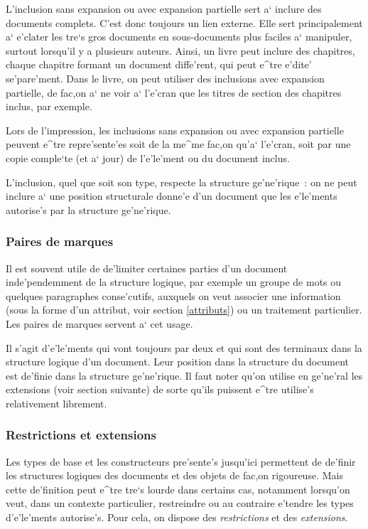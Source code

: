 L'inclusion sans expansion ou avec expansion partielle sert a` inclure
des documents complets. C'est donc toujours un lien externe. Elle sert
principalement a` e'clater les tre`s gros documents en sous-documents
plus faciles a` manipuler, surtout lorsqu'il y a plusieurs auteurs.
Ainsi, un livre peut inclure des chapitres, chaque chapitre formant
un document diffe'rent, qui peut e^tre e'dite' se'pare'ment. Dans le
livre, on peut utiliser des inclusions avec expansion partielle,
de fac,on a` ne voir a` l'e'cran que les titres de section des chapitres
inclus, par exemple.

Lors de l'impression, les inclusions sans expansion ou avec expansion
partielle peuvent e^tre repre'sente'es soit de la me^me fac,on qu'a`
l'e'cran, soit par une copie comple`te (et a` jour) de l'e'le'ment
ou du document inclus.

L'inclusion, quel que soit son type, respecte la structure ge'ne'rique~:
on ne peut inclure a` une
position structurale donne'e d'un document que les e'le'ments autorise's par
la structure ge'ne'rique.

\subsubsection{Paires de marques}

Il est souvent utile de de'limiter certaines parties d'un document
inde'pendemment de la structure logique, par exemple un groupe de mots
ou quelques paragraphes conse'cutifs, auxquels on veut associer une
information (sous la forme d'un attribut, voir section \ref{attributs})
ou un traitement particulier. Les paires de marques servent a` cet usage.

Il s'agit d'e'le'ments qui vont toujours par deux et qui sont des
terminaux dans la structure logique d'un document. Leur position dans
la structure du document est de'finie dans la structure ge'ne'rique.
Il faut noter qu'on utilise en ge'ne'ral les extensions (voir section
suivante) de sorte qu'ils puissent e^tre utilise's relativement
librement.

\subsubsection{Restrictions et extensions}

Les types de base et les constructeurs pre'sente's jusqu'ici permettent de
de'finir les structures logiques des documents et des objets de fac,on
rigoureuse. Mais cette de'finition peut e^tre tre`s lourde dans certains cas,
notamment lorsqu'on veut, dans un contexte particulier, restreindre ou
au contraire e'tendre les types d'e'le'ments autorise's. Pour cela, on
dispose des {\em restrictions} et des {\em extensions}.

